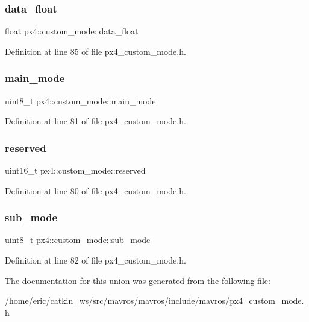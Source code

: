 \subsubsection{\texorpdfstring{data\_float}{data\_float}}
{\footnotesize\ttfamily float px4\+::custom\+\_\+mode\+::data\+\_\+float}



Definition at line 85 of file px4\+\_\+custom\+\_\+mode.\+h.

\mbox{\label{unionpx4_1_1custom__mode_a8ae6c1c52c4eb4592788ccb634892a78}} 
\subsubsection{\texorpdfstring{main\_mode}{main\_mode}}
{\footnotesize\ttfamily uint8\+\_\+t px4\+::custom\+\_\+mode\+::main\+\_\+mode}



Definition at line 81 of file px4\+\_\+custom\+\_\+mode.\+h.

\mbox{\label{unionpx4_1_1custom__mode_afe892ba3de4cc366dc7b9d59faf675fe}} 
\subsubsection{\texorpdfstring{reserved}{reserved}}
{\footnotesize\ttfamily uint16\+\_\+t px4\+::custom\+\_\+mode\+::reserved}



Definition at line 80 of file px4\+\_\+custom\+\_\+mode.\+h.

\mbox{\label{unionpx4_1_1custom__mode_ade80ea12ee52df667172796a31113beb}} 
\subsubsection{\texorpdfstring{sub\_mode}{sub\_mode}}
{\footnotesize\ttfamily uint8\+\_\+t px4\+::custom\+\_\+mode\+::sub\+\_\+mode}



Definition at line 82 of file px4\+\_\+custom\+\_\+mode.\+h.



The documentation for this union was generated from the following file\+:\begin{DoxyCompactItemize}
\item 
/home/eric/catkin\+\_\+ws/src/mavros/mavros/include/mavros/\mbox{\hyperlink{px4__custom__mode_8h}{px4\+\_\+custom\+\_\+mode.\+h}}\end{DoxyCompactItemize}
